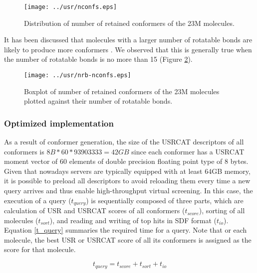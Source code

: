 \documentclass[a4,center,fleqn]{NAR}
\begin{document}
\begin{figure}
\begin{center}
\texttt{[image: ../usr/nconfs.eps]}
\end{center}
\caption{Distribution of number of retained conformers of the 23M molecules.}
\label{nconfs}
\end{figure}

It has been discussed that molecules with a larger number of rotatable bonds are likely to produce more conformers \cite{1127}. We observed that this is generally true when the number of rotatable bonds is no more than 15 (Figure \ref{nrb-nconfs}).

\begin{figure}
\begin{center}
\texttt{[image: ../usr/nrb-nconfs.eps]}
\end{center}
\caption{Boxplot of number of retained conformers of the 23M molecules plotted against their number of rotatable bonds.}
\label{nrb-nconfs}
\end{figure}

\subsubsection{Optimized implementation}

As a result of conformer generation, the size of the USRCAT descriptors of all conformers is $8B*60*93903333=42GB$ since each conformer has a USRCAT moment vector of 60 elements of double precision floating point type of 8 bytes. Given that nowadays servers are typically equipped with at least 64GB memory, it is possible to preload all descriptors to avoid reloading them every time a new query arrives and thus enable high-throughput virtual screening. In this case, the execution of a query ($t_{query}$) is sequentially composed of three parts, which are calculation of USR and USRCAT scores of all conformers ($t_{score}$), sorting of all molecules ($t_{sort}$), and reading and writing of top hits in SDF format ($t_{io}$). Equation \eqref{t_query} summaries the required time for a query. Note that or each molecule, the best USR or USRCAT score of all its conformers is assigned as the score for that molecule.

\begin{equation}
t_{query}=t_{score}+t_{sort}+t_{io}
\label{t_query}
\end{equation}
\end{document}
